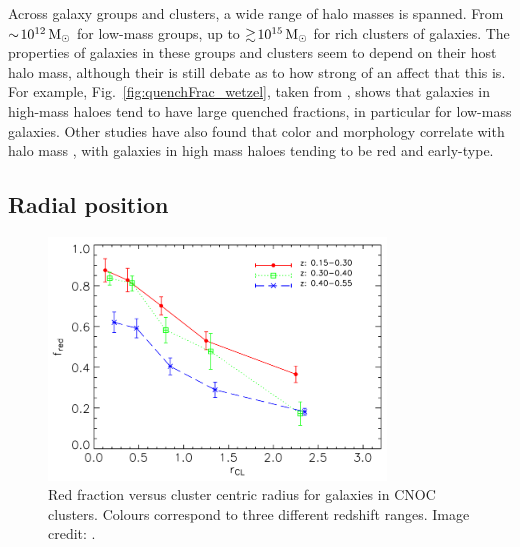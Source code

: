Across galaxy groups and clusters, a wide range of halo masses is
spanned.  From $\sim\! 10^{12}\,\mathrm{M_{\odot}}$ for low-mass groups, up to
$\gtrsim\! 10^{15}\,\mathrm{M_{\odot}}$ for rich clusters of galaxies.  The
properties of galaxies in these groups and clusters seem to depend on
their host halo mass, although their is still debate as to how strong
of an affect that this is.  For example,
Fig.~\ref{fig:quenchFrac_wetzel}, taken from \citet{wetzel2012}, shows
that galaxies in high-mass haloes tend to have large quenched
fractions, in particular for low-mass galaxies.  Other studies have
also found that color and morphology correlate with halo mass
\citep[e.g.][]{kimm2009, wilman2012}, with galaxies in high mass
haloes tending to be red and early-type.

\subsection{Radial position}
\label{sec:radial_pos}

\begin{figure}
  \centering
  \includegraphics[width=0.8\textwidth]{redFrac_r_li.png}
  \caption{Red fraction versus cluster centric radius for galaxies in
    CNOC clusters.  Colours correspond to three different redshift
    ranges. Image credit: \citet{li2009}.}
  \label{fig:redFrac_r_li}
\end{figure}

